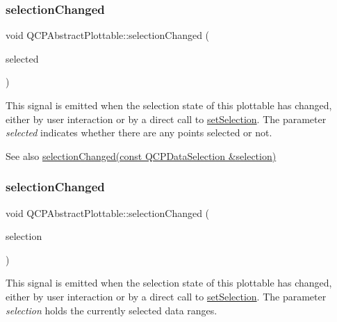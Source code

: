 \subsubsection{\texorpdfstring{selection\+Changed}{selectionChanged}\hspace{0.1cm}{\footnotesize\ttfamily [1/2]}}
{\footnotesize\ttfamily void Q\+C\+P\+Abstract\+Plottable\+::selection\+Changed (\begin{DoxyParamCaption}\item[{bool}]{selected }\end{DoxyParamCaption})\hspace{0.3cm}{\ttfamily [signal]}}

This signal is emitted when the selection state of this plottable has changed, either by user interaction or by a direct call to \hyperlink{classQCPAbstractPlottable_a219bc5403a9d85d3129165ec3f5ae436}{set\+Selection}. The parameter {\itshape selected} indicates whether there are any points selected or not.

\begin{DoxySeeAlso}{See also}
\hyperlink{classQCPAbstractPlottable_a787a9c39421059006891744b731fa473}{selection\+Changed(const Q\+C\+P\+Data\+Selection \&selection)} 
\end{DoxySeeAlso}
\mbox{\label{classQCPAbstractPlottable_a787a9c39421059006891744b731fa473}} 
\subsubsection{\texorpdfstring{selection\+Changed}{selectionChanged}\hspace{0.1cm}{\footnotesize\ttfamily [2/2]}}
{\footnotesize\ttfamily void Q\+C\+P\+Abstract\+Plottable\+::selection\+Changed (\begin{DoxyParamCaption}\item[{const \hyperlink{classQCPDataSelection}{Q\+C\+P\+Data\+Selection} \&}]{selection }\end{DoxyParamCaption})\hspace{0.3cm}{\ttfamily [signal]}}

This signal is emitted when the selection state of this plottable has changed, either by user interaction or by a direct call to \hyperlink{classQCPAbstractPlottable_a219bc5403a9d85d3129165ec3f5ae436}{set\+Selection}. The parameter {\itshape selection} holds the currently selected data ranges.

